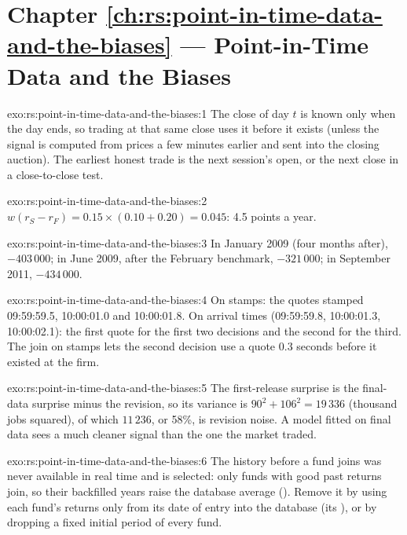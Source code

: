 \section*{Chapter \ref{ch:rs:point-in-time-data-and-the-biases} --- Point-in-Time Data and the Biases}

\begin{solution}{exo:rs:point-in-time-data-and-the-biases:1}
The close of day $t$ is known only when the day ends, so trading at that same close uses it before it exists (unless the signal
is computed from prices a few minutes earlier and sent into the closing auction). The earliest honest trade is the next
session's open, or the next close in a close-to-close test.
\end{solution}

\begin{solution}{exo:rs:point-in-time-data-and-the-biases:2}
$w(r_S - r_F) = 0.15 \times (0.10 + 0.20) = 0.045$: 4.5 points a year.
\end{solution}

\begin{solution}{exo:rs:point-in-time-data-and-the-biases:3}
In January 2009 (four months after), $-403\,000$; in June 2009, after the February benchmark, $-321\,000$; in September 2011,
$-434\,000$.
\end{solution}

\begin{solution}{exo:rs:point-in-time-data-and-the-biases:4}
On stamps: the quotes stamped 09:59:59.5, 10:00:01.0 and 10:00:01.8. On arrival times (09:59:59.8, 10:00:01.3, 10:00:02.1): the
first quote for the first two decisions and the second for the third. The join on stamps lets the second decision use a quote
0.3 seconds before it existed at the firm.
\end{solution}

\begin{solution}{exo:rs:point-in-time-data-and-the-biases:5}
The first-release surprise is the final-data surprise minus the revision, so its variance is $90^2 + 106^2 = 19\,336$ (thousand
jobs squared), of which $11\,236$, or 58\%, is revision noise. A model fitted on final data sees a much cleaner signal than the one
the market traded.
\end{solution}

\begin{solution}{exo:rs:point-in-time-data-and-the-biases:6}
The history before a fund joins was never available in real time and is selected: only funds with good past returns join, so
their backfilled years raise the database average (). Remove it by using each fund's returns only from its date of
entry into the database (its ), or by dropping a fixed initial period of every fund.
\end{solution}

